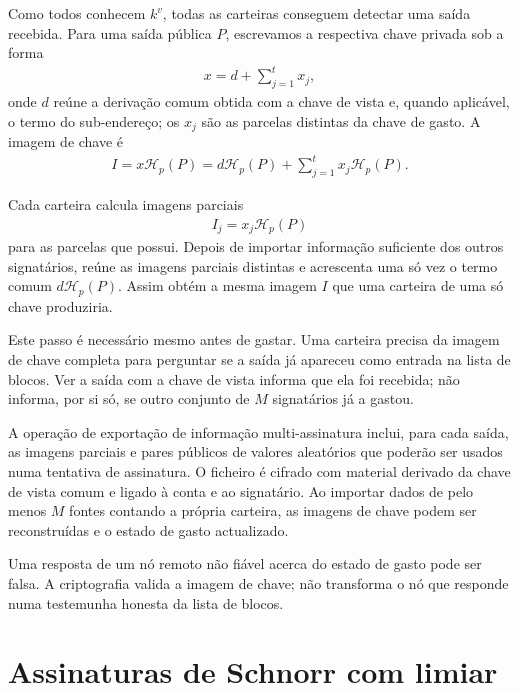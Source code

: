 %
Como todos conhecem \(k^v\), todas as carteiras conseguem detectar uma saída
recebida. Para uma saída pública \(P\), escrevamos a respectiva chave privada
sob a forma
\begin{align}
 x=d+\sum_{j=1}^{t}x_j,
 \label{eq:multisig-output-secret}
\end{align}
onde \(d\) reúne a derivação comum obtida com a chave de vista e, quando
aplicável, o termo do sub-endereço; os \(x_j\) são as parcelas distintas da
chave de gasto. A imagem de chave é
\begin{align*}
 I=x\mathcal H_p(P)
   =d\mathcal H_p(P)+\sum_{j=1}^{t}x_j\mathcal H_p(P).
\end{align*}

Cada carteira calcula imagens parciais
\begin{align*}
 I_j=x_j\mathcal H_p(P)
\end{align*}
para as parcelas que possui. Depois de importar informação suficiente dos
outros signatários, reúne as imagens parciais distintas e acrescenta uma só
vez o termo comum \(d\mathcal H_p(P)\). Assim obtém a mesma imagem \(I\) que
uma carteira de uma só chave produziria.

Este passo é necessário mesmo antes de gastar. Uma carteira precisa da imagem
de chave completa para perguntar se a saída já apareceu como entrada na lista
de blocos. Ver a saída com a chave de vista informa que ela foi recebida; não
informa, por si só, se outro conjunto de \(M\) signatários já a gastou.

%
A operação de exportação de informação multi-assinatura inclui, para cada
saída, as imagens parciais e pares públicos de valores aleatórios que poderão
ser usados numa tentativa de assinatura. O ficheiro é cifrado com material
derivado da chave de vista comum e ligado à conta e ao signatário. Ao importar
dados de pelo menos \(M\) fontes contando a própria carteira, as imagens de
chave podem ser reconstruídas e o estado de gasto actualizado.

Uma resposta de um nó remoto não fiável acerca do estado de gasto pode ser
falsa. A criptografia valida a imagem de chave; não transforma o nó que
responde numa testemunha honesta da lista de blocos.

\section{Assinaturas de Schnorr com limiar}
\label{sec:threshold-schnorr}

